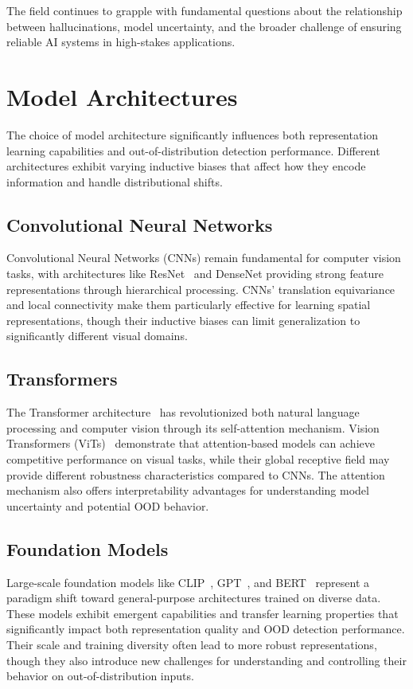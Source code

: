\documentclass[11pt, oneside]{book}
\theoremstyle{plain}
\theoremstyle{definition}
\theoremstyle{remark}
\begin{document}
The field continues to grapple with fundamental questions about the relationship between hallucinations, model uncertainty, and the broader challenge of ensuring reliable AI systems in high-stakes applications.

\section{Model Architectures}

The choice of model architecture significantly influences both representation learning capabilities and out-of-distribution detection performance. Different architectures exhibit varying inductive biases that affect how they encode information and handle distributional shifts.

\subsection{Convolutional Neural Networks}

Convolutional Neural Networks (CNNs) remain fundamental for computer vision tasks, with architectures like ResNet~\citep{he2016deep} and DenseNet providing strong feature representations through hierarchical processing. CNNs' translation equivariance and local connectivity make them particularly effective for learning spatial representations, though their inductive biases can limit generalization to significantly different visual domains.

\subsection{Transformers}

The Transformer architecture~\citep{vaswani2017attention} has revolutionized both natural language processing and computer vision through its self-attention mechanism. Vision Transformers (ViTs)~\citep{dosovitskiy2020image} demonstrate that attention-based models can achieve competitive performance on visual tasks, while their global receptive field may provide different robustness characteristics compared to CNNs. The attention mechanism also offers interpretability advantages for understanding model uncertainty and potential OOD behavior.

\subsection{Foundation Models}

Large-scale foundation models like CLIP~\citep{radford2021learning}, GPT~\citep{brown2020language}, and BERT~\citep{devlin2018bert} represent a paradigm shift toward general-purpose architectures trained on diverse data. These models exhibit emergent capabilities and transfer learning properties that significantly impact both representation quality and OOD detection performance. Their scale and training diversity often lead to more robust representations, though they also introduce new challenges for understanding and controlling their behavior on out-of-distribution inputs.
\end{document}
